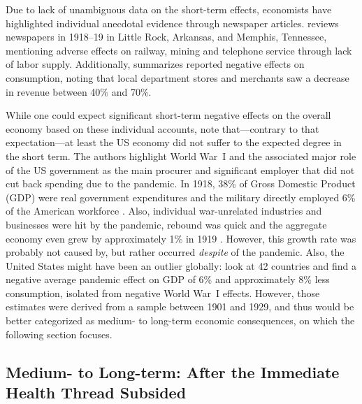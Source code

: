 \documentclass[12pt,a4paper]{article}
\begin{document}
Due to lack of unambiguous data on the short-term effects, economists have highlighted individual anecdotal evidence through newspaper articles.
\cite{garrettEconomicEffects19182007} reviews newspapers in 1918--19 in Little Rock, Arkansas, and Memphis, Tennessee, mentioning adverse effects on railway, mining and telephone service through lack of labor supply.
Additionally, \cite{garrettEconomicEffects19182007} summarizes reported negative effects on consumption, noting that local department stores and merchants saw a decrease in revenue between 40\% and 70\%.

While one could expect significant short-term negative effects on the overall economy based on these individual accounts, \cite{benmelech1918InfluenzaDid2020} note that---contrary to that expec\-tation---at least the US economy did not suffer to the expected degree in the short term.
The authors highlight World War~I and the associated major role of the US government as the main procurer and significant employer that did not cut back spending due to the pandemic.
In 1918, 38\% of Gross Domestic Product (GDP) were real government expenditures and the military directly employed 6\% of the American workforce \citep{benmelech1918InfluenzaDid2020}.
Also, individual war-unrelated industries and businesses were hit by the pandemic, rebound was quick and the aggregate economy even grew by approximately 1\% in 1919 \citep{romerWorldWarPostwar1988}.
However, this growth rate was probably not caused by, but rather occurred \textit{despite} of the pandemic.
Also, the United States might have been an outlier globally:
\cite{barroCoronavirusGreatInfluenza2020} look at 42 countries and find a negative average pandemic effect on GDP of 6\% and approximately 8\% less consumption, isolated from negative World War~I effects.
However, those estimates were derived from a sample between 1901 and 1929, and thus would be better categorized as medium- to long-term economic consequences, on which the following section focuses.


\subsection{Medium- to Long-term: After the Immediate Health Thread Subsided} \label{sec:medlong}
\end{document}
